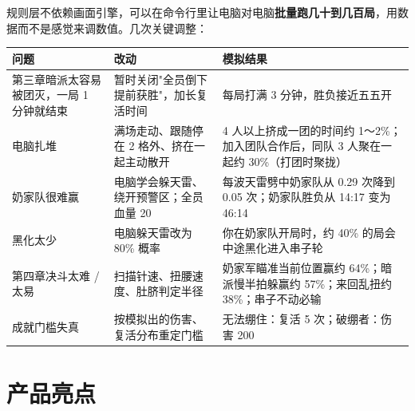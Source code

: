\documentclass[11pt,a4paper]{ctexart}
\newcommand{\hl}[1]{\textbf{\color{milk}#1}}
\begin{document}
规则层不依赖画面引擎，可以在命令行里让电脑对电脑\hl{批量跑几十到几百局}，用数据而不是感觉来调数值。几次关键调整：

\begin{center}
\begin{tabularx}{\linewidth}{>{\raggedright\arraybackslash}p{3.2cm} X X}
\toprule
问题 & 改动 & 模拟结果 \\
\midrule
第三章暗派太容易被团灭，一局 1 分钟就结束 & 暂时关闭"全员倒下提前获胜"，加长复活时间 & 每局打满 3 分钟，胜负接近五五开 \\
电脑扎堆 & 满场走动、跟随停在 2 格外、挤在一起主动散开 & 4 人以上挤成一团的时间约 1～2\%；加入团队合作后，同队 3 人聚在一起约 30\%（打团时聚拢） \\
奶家队很难赢 & 电脑学会躲天雷、绕开预警区；全员血量 20 & 每波天雷劈中奶家队从 0.29 次降到 0.05 次；奶家队胜负从 14:17 变为 46:14 \\
黑化太少 & 电脑躲天雷改为 80\% 概率 & 你在奶家队开局时，约 40\% 的局会中途黑化进入串子轮 \\
第四章决斗太难 / 太易 & 扫描针速、扭腰速度、肚脐判定半径 & 奶家军瞄准当前位置赢约 64\%；暗派慢半拍躲赢约 57\%；来回乱扭约 38\%；串子不动必输 \\
成就门槛失真 & 按模拟出的伤害、复活分布重定门槛 & 无法绷住：复活 5 次；破绷者：伤害 200 \\
\bottomrule
\end{tabularx}
\end{center}

\section{产品亮点}
\end{document}
